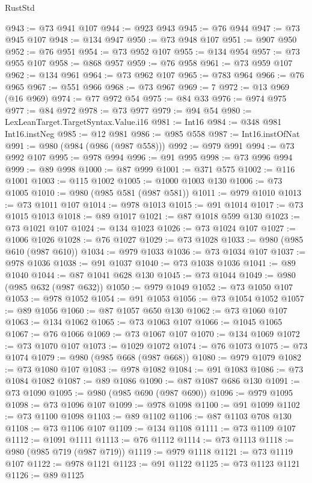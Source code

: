 \begin{lexlean}{RustStd}
\begin{coremodule}
{\begin{coremodule}
{{{{{@943 := @73 @941 @107
@944 := @923 @943
@945 := @76 @944
@947 := @73 @945 @107
@948 := @134 @947
@950 := @73 @948 @107
@951 := @907 @950
@952 := @76 @951
@954 := @73 @952 @107
@955 := @134 @954
@957 := @73 @955 @107
@958 := @868 @957
@959 := @76 @958
@961 := @73 @959 @107
@962 := @134 @961
@964 := @73 @962 @107
@965 := @783 @964
@966 := @76 @965
@967 := @551 @966
@968 := @73 @967
@969 := 7
@972 := @13 @969 (@16 @969)
@974 := @77 @972 @54
@975 := @84 @33
@976 := @974 @975
@977 := @84 @972
@978 := @73 @977
@979 := @94 @54
@980 := LexLeanTarget.TargetSyntax.Value.i16
@981 := Int16
@984 := @348 @981 Int16.instNeg
@985 := @12 @981
@986 := @985 @558
@987 := Int16.instOfNat
@991 := @980 (@984 (@986 (@987 @558)))
@992 := @979 @991
@994 := @73 @992 @107
@995 := @978 @994
@996 := @91 @995
@998 := @73 @996 @994
@999 := @89 @998
@1000 := @87 @999
@1001 := @371 @575
@1002 := @116 @1001
@1003 := @115 @1002
@1005 := @1000 @1003 @130
@1006 := @73 @1005
@1010 := @980 (@985 @581 (@987 @581))
@1011 := @979 @1010
@1013 := @73 @1011 @107
@1014 := @978 @1013
@1015 := @91 @1014
@1017 := @73 @1015 @1013
@1018 := @89 @1017
@1021 := @87 @1018 @599 @130
@1023 := @73 @1021 @107
@1024 := @134 @1023
@1026 := @73 @1024 @107
@1027 := @1006 @1026
@1028 := @76 @1027
@1029 := @73 @1028
@1033 := @980 (@985 @610 (@987 @610))
@1034 := @979 @1033
@1036 := @73 @1034 @107
@1037 := @978 @1036
@1038 := @91 @1037
@1040 := @73 @1038 @1036
@1041 := @89 @1040
@1044 := @87 @1041 @628 @130
@1045 := @73 @1044
@1049 := @980 (@985 @632 (@987 @632))
@1050 := @979 @1049
@1052 := @73 @1050 @107
@1053 := @978 @1052
@1054 := @91 @1053
@1056 := @73 @1054 @1052
@1057 := @89 @1056
@1060 := @87 @1057 @650 @130
@1062 := @73 @1060 @107
@1063 := @134 @1062
@1065 := @73 @1063 @107
@1066 := @1045 @1065
@1067 := @76 @1066
@1069 := @73 @1067 @107
@1070 := @134 @1069
@1072 := @73 @1070 @107
@1073 := @1029 @1072
@1074 := @76 @1073
@1075 := @73 @1074
@1079 := @980 (@985 @668 (@987 @668))
@1080 := @979 @1079
@1082 := @73 @1080 @107
@1083 := @978 @1082
@1084 := @91 @1083
@1086 := @73 @1084 @1082
@1087 := @89 @1086
@1090 := @87 @1087 @686 @130
@1091 := @73 @1090
@1095 := @980 (@985 @690 (@987 @690))
@1096 := @979 @1095
@1098 := @73 @1096 @107
@1099 := @978 @1098
@1100 := @91 @1099
@1102 := @73 @1100 @1098
@1103 := @89 @1102
@1106 := @87 @1103 @708 @130
@1108 := @73 @1106 @107
@1109 := @134 @1108
@1111 := @73 @1109 @107
@1112 := @1091 @1111
@1113 := @76 @1112
@1114 := @73 @1113
@1118 := @980 (@985 @719 (@987 @719))
@1119 := @979 @1118
@1121 := @73 @1119 @107
@1122 := @978 @1121
@1123 := @91 @1122
@1125 := @73 @1123 @1121
@1126 := @89 @1125
}}}}}
\end{coremodule}}
\end{coremodule}
\end{lexlean}
